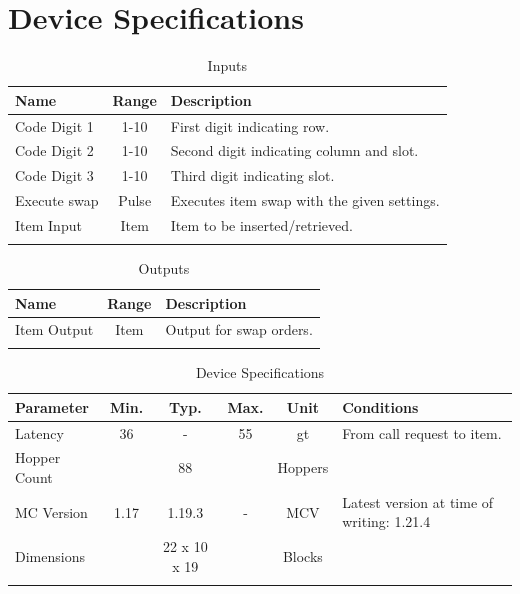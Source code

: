 \documentclass[10pt]{datasheet}
\begin{document}
\onecolumn

\section{Device Specifications}

\begin{table}[H]
    \caption{Inputs}
    \begin{tabularx}{\textwidth}{l | c | X}
        \thickhline
        \textbf{Name} & \textbf{Range} & \textbf{Description} \\
        \hline
        Code Digit 1 & 1-10 & First digit indicating row. \\
        Code Digit 2 & 1-10 & Second digit indicating column and slot. \\
        Code Digit 3 & 1-10 & Third digit indicating slot. \\
        \hline
        Execute swap & Pulse & Executes item swap with the given settings. \\
        \hline
        Item Input & Item & Item to be inserted/retrieved. \\
        \thickhline
\end{tabularx}
\end{table}

\begin{table}[H]
    \caption{Outputs}
    \begin{tabularx}{\textwidth}{l | c | X}
        \thickhline
        \textbf{Name} & \textbf{Range} & \textbf{Description} \\
        \hline
        Item Output & Item & Output for swap orders. \\
        \thickhline
\end{tabularx}
\end{table}

\begin{table}[H]
    \caption{Device Specifications}
    \begin{tabularx}{\textwidth}{l | c c c | c | X}
        \thickhline
        \textbf{Parameter} & \textbf{Min.} & \textbf{Typ.} & \textbf{Max.} &
        \textbf{Unit} & \textbf{Conditions} \\
        \hline
        Latency & 36 & - & 55 & gt & From call request to item. \\
        \hline
        Hopper Count & & 88 & & Hoppers & \\
        \hline
        MC Version & 1.17 & 1.19.3 & - & MCV & Latest version at time of writing: 1.21.4\\
        \hline
        Dimensions & & 22 x 10 x 19 & & Blocks & \\
        \thickhline
\end{tabularx}
\end{table}
\end{document}
